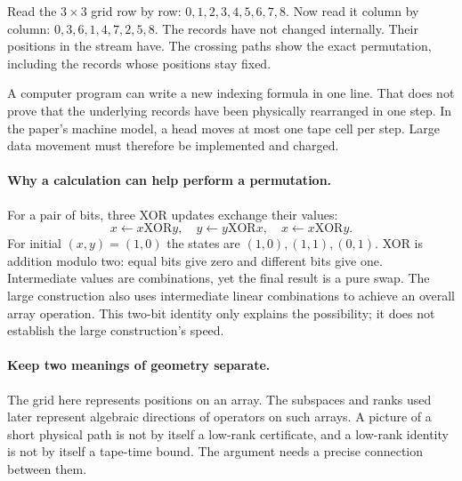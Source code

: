
Read the $3\times3$ grid row by row: $0,1,2,3,4,5,6,7,8$.
Now read it column by column: $0,3,6,1,4,7,2,5,8$.
The records have not changed internally. Their positions in the stream have.
The crossing paths show the exact permutation, including the records whose
positions stay fixed.


A computer program can write a new indexing formula in one line. That does
not prove that the underlying records have been physically rearranged in one
step. In the paper's machine model, a head moves at most one tape cell per
step. Large data movement must therefore be implemented and charged.

\paragraph{Why a calculation can help perform a permutation.}
For a pair of bits, three XOR updates exchange their values:
\[
 x\leftarrow x\mathbin{\mathrm{XOR}}y,\quad
 y\leftarrow y\mathbin{\mathrm{XOR}}x,\quad
 x\leftarrow x\mathbin{\mathrm{XOR}}y.
\]
For initial $(x,y)=(1,0)$ the states are $(1,0),(1,1),(0,1)$.
XOR is addition modulo two: equal bits give zero and different bits give one.
Intermediate values are combinations, yet the final result is a pure swap.
The large construction also uses intermediate linear combinations to achieve
an overall array operation. This two-bit identity only explains the possibility;
it does not establish the large construction's speed.

\paragraph{Keep two meanings of geometry separate.}
The grid here represents positions on an array. The subspaces and ranks used
later represent algebraic directions of operators on such arrays. A picture
of a short physical path is not by itself a low-rank certificate, and a
low-rank identity is not by itself a tape-time bound. The argument needs a
precise connection between them.

